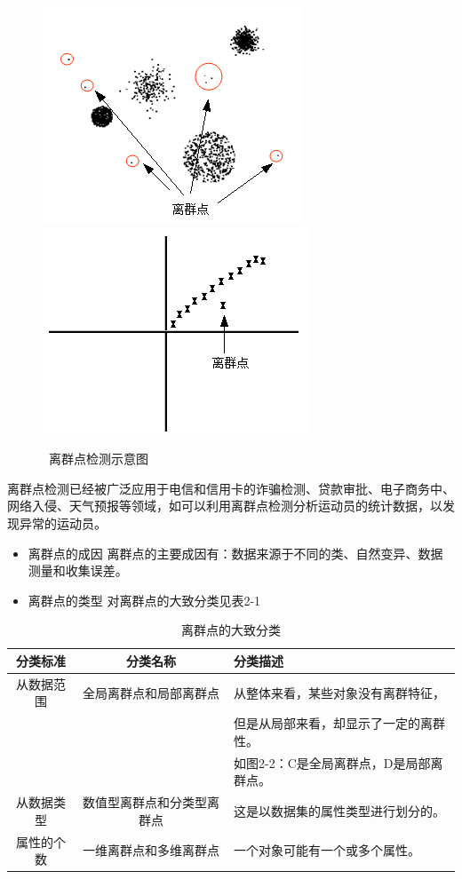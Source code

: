 \begin{figure}[thbp!]
\centering
\includegraphics[width=0.4\linewidth]{figure/2-1}
\includegraphics[width=0.4\linewidth]{figure/2-2}
\caption{\ 离群点检测示意图}
\label{fig:2-2}
\end{figure}

离群点检测已经被广泛应用于电信和信用卡的诈骗检测、贷款审批、电子商务中、网络入侵、天气预报等领域，如可以利用离群点检测分析运动员的统计数据，以发现异常的运动员。

\begin{itemize}[leftmargin=1cm]

\item 离群点的成因 离群点的主要成因有：数据来源于不同的类、自然变异、数据测量和收集误差。

\item 离群点的类型  对离群点的大致分类见表2-1
\end{itemize}

\begin{table}[thbp]\footnotesize
\caption{离群点的大致分类}
\begin{center}
\begin{tabular}{c|cl}
\hline  分类标准& 分类名称 & 分类描述  \\ 
\hline 从数据范围 & 全局离群点和局部离群点 & 从整体来看，某些对象没有离群特征， \\ 
& & 但是从局部来看，却显示了一定的离群性。\\ 
& & 如图2-2：C是全局离群点，D是局部离群点。 \\ 
\hline 从数据类型 & 数值型离群点和分类型离群点 & 这是以数据集的属性类型进行划分的。  \\ 
\hline 属性的个数 & 一维离群点和多维离群点 & 一个对象可能有一个或多个属性。 \\ 
\hline
\end{tabular} 
\end{center}
\label{tb:filter}
\end{table}

